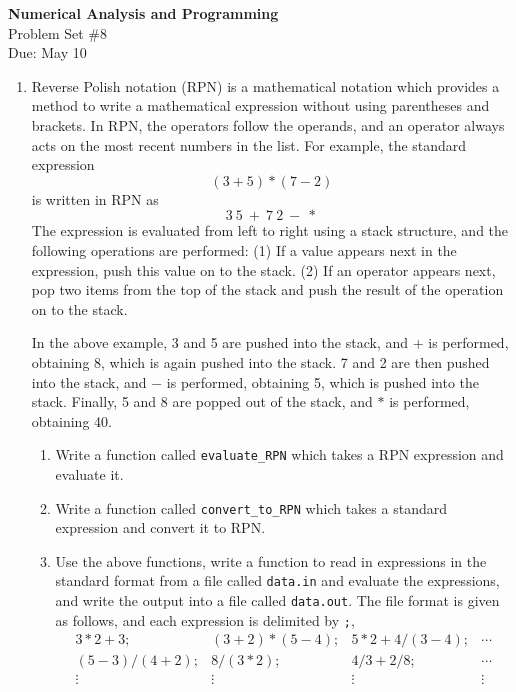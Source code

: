 \documentclass[12pt]{article}
\begin{document}
\begin{center}
\Large
\textbf{Numerical Analysis and Programming}\\
\large
Problem Set \#8\\
Due: May 10
\end{center}

\begin{enumerate}
\item Reverse Polish notation (RPN) is a mathematical notation which provides a method to write a mathematical expression without using parentheses and brackets. In RPN, the operators follow the operands, and  an operator always acts on the most recent numbers in the list. For example, the standard  expression
\[
(3 + 5) * (7 - 2)
\]
is written in  RPN as 
\[
3\  5\  +\  7\  2\  -\  *
\]
The expression is evaluated from left to right using a stack structure, and the following operations are performed: (1) If a value appears next in the expression, push this value on to the stack. (2) If an operator appears next, pop two items from the top of the stack and push the result of the operation on to the stack.

In the above example, 3 and 5 are pushed into the stack, and  $+$  is performed, obtaining 8, which is again pushed into the stack. 7 and 2 are then pushed into the stack, and  $-$ is performed, obtaining 5, which is pushed into the stack. Finally, 5 and 8 are popped out of the stack, and $*$ is performed, obtaining 40. 

\begin{enumerate}
\item Write a function called {\small \verb!evaluate_RPN!} which takes a RPN expression and evaluate it.
\item Write a function called {\small \verb!convert_to_RPN!} which takes a standard expression and convert it to RPN.
\item Use the above functions, write a function to read in expressions in the standard format from a file called \verb!data.in! and evaluate the expressions, and write the output into a file called \verb!data.out!. The file format is given as follows, and each expression is delimited by {\tt ;}, 
\[
\begin{array}{llll}
3*2+3; & (3+2)*(5-4); &  5*2+4/(3-4); &\cdots\\
(5-3)/(4+2); & 8/(3*2); & 4/3+2/8; &\cdots \\
\vdots& \vdots & \vdots & \vdots 
\end{array}
\]
\end{enumerate} 
\end{enumerate}
\end{document}
